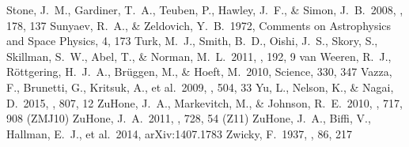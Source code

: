 \documentclass{emulateapj}
\begin{document}
\begin{thebibliography}{}
 Stone, J.~M., Gardiner, T.~A., Teuben, P., Hawley, J.~F., \& Simon, J.~B.\ 2008, \apjs, 178, 137
 Sunyaev, R.~A., \& Zeldovich, Y.~B.\ 1972, Comments on Astrophysics and Space Physics, 4, 173
 Turk, M.~J., Smith, B.~D., Oishi, J.~S., Skory, S., Skillman, S.~W., Abel, T., \& Norman, M.~L.\ 2011, \apjs, 192, 9
 van Weeren, R.~J., R{\"o}ttgering, H.~J.~A., Br{\"u}ggen, M., \& Hoeft, M.\ 2010, Science, 330, 347
 Vazza, F., Brunetti, G., Kritsuk, A., et al.\ 2009, \aap, 504, 33
 Yu, L., Nelson, K., \& Nagai, D.\ 2015, \apj, 807, 12
 ZuHone, J.~A., Markevitch, M., \& Johnson, R.~E.\ 2010, \apj, 717, 908 (ZMJ10)
 ZuHone, J.~A.\ 2011, \apj, 728, 54 (Z11)
 ZuHone, J.~A., Biffi, V., Hallman, E.~J., et al.\ 2014, arXiv:1407.1783
 Zwicky, F.\ 1937, \apj, 86, 217
\end{thebibliography}{}
\end{document}
